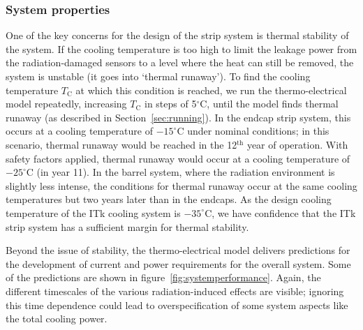 \subsubsection{System properties}\label{sec:systemprop}
One of the key concerns for the design of the strip system is thermal stability of the system. If the cooling temperature is too high to limit the leakage power from the radiation-damaged sensors to a level where the heat can still be removed, the system is unstable (it goes into `thermal runaway').
To find the cooling temperature $T_\text{C}$ at which this condition is reached, we run the thermo-electrical model repeatedly, increasing $T_\text{C}$ in steps of 5$^\circ$C, until the model finds thermal runaway (as described in Section~\ref{sec:running}). In the endcap strip system, this occurs at a cooling temperature of $-15^\circ$C under nominal conditions; in this scenario, thermal runaway would be reached in the 12$^\text{th}$ year of operation. With safety factors applied, thermal runaway would occur at a cooling temperature of $-25^\circ$C (in year 11).
In the barrel system, where the radiation environment is slightly less intense, the conditions for thermal runaway occur at the same cooling temperatures but two years later than in the endcaps.
As the design cooling temperature of the ITk cooling system is $-35^\circ$C, we have confidence that the ITk strip system has a sufficient margin for thermal stability.

Beyond the issue of stability, the thermo-electrical model delivers predictions for the development of current and power requirements for the overall system. Some of the predictions are shown in figure~\ref{fig:systemperformance}. Again, the different timescales of the various radiation-induced effects are visible; ignoring this time dependence could lead to overspecification of some system aspects like the total cooling power.

